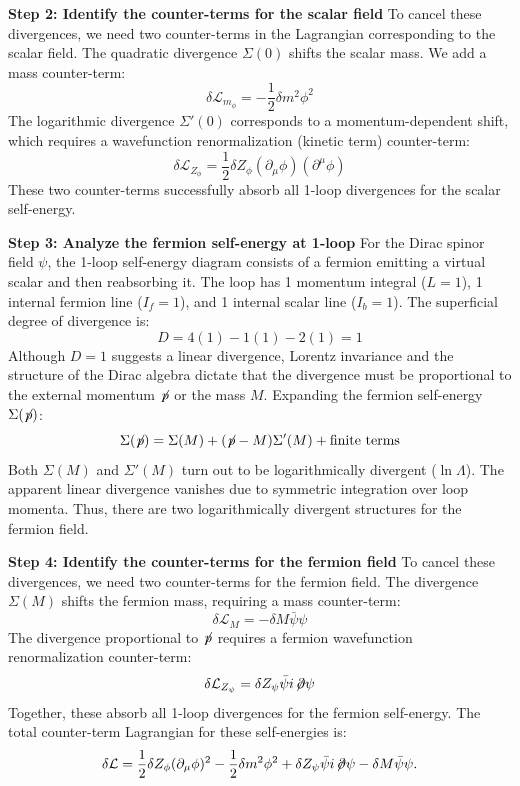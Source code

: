 \begin{solution}
\textbf{Step 2: Identify the counter-terms for the scalar field}
To cancel these divergences, we need two counter-terms in the Lagrangian corresponding to the scalar field.
The quadratic divergence $\Sigma(0)$ shifts the scalar mass. We add a mass counter-term:
\[ \delta\mathcal{L}_{m_\phi} = -\frac{1}{2} \delta m^2 \phi^2 \]
The logarithmic divergence $\Sigma'(0)$ corresponds to a momentum-dependent shift, which requires a wavefunction renormalization (kinetic term) counter-term:
\[ \delta\mathcal{L}_{Z_\phi} = \frac{1}{2} \delta Z_\phi (\partial_\mu \phi)(\partial^\mu \phi) \]
These two counter-terms successfully absorb all 1-loop divergences for the scalar self-energy.

\textbf{Step 3: Analyze the fermion self-energy at 1-loop}
For the Dirac spinor field $\psi$, the 1-loop self-energy diagram consists of a fermion emitting a virtual scalar and then reabsorbing it.
The loop has 1 momentum integral ($L=1$), 1 internal fermion line ($I_f = 1$), and 1 internal scalar line ($I_b = 1$).
The superficial degree of divergence is:
\[ D = 4(1) - 1(1) - 2(1) = 1 \]
Although $D = 1$ suggests a linear divergence, Lorentz invariance and the structure of the Dirac algebra dictate that the divergence must be proportional to the external momentum $\not\!p$ or the mass $M$.
Expanding the fermion self-energy $\Sigma(\not\!p)$:
\[ \Sigma(\not\!p) = \Sigma(M) + (\not\!p - M) \Sigma'(M) + \text{finite terms} \]
Both $\Sigma(M)$ and $\Sigma'(M)$ turn out to be logarithmically divergent ($\ln \Lambda$). The apparent linear divergence vanishes due to symmetric integration over loop momenta.
Thus, there are two logarithmically divergent structures for the fermion field.

\textbf{Step 4: Identify the counter-terms for the fermion field}
To cancel these divergences, we need two counter-terms for the fermion field.
The divergence $\Sigma(M)$ shifts the fermion mass, requiring a mass counter-term:
\[ \delta\mathcal{L}_{M} = -\delta M \bar{\psi} \psi \]
The divergence proportional to $\not\!p$ requires a fermion wavefunction renormalization counter-term:
\[ \delta\mathcal{L}_{Z_\psi} = \delta Z_\psi \bar{\psi} i \!\not\!\partial \psi \]
Together, these absorb all 1-loop divergences for the fermion self-energy. The total counter-term Lagrangian for these self-energies is:
\begin{equation}
    \delta \mathcal{L} = \frac{1}{2} \delta Z_\phi (\partial_\mu \phi)^2 - \frac{1}{2} \delta m^2 \phi^2 + \delta Z_\psi \bar{\psi} i \!\not\!\partial \psi - \delta M \bar{\psi} \psi.
\end{equation}


\end{solution}

